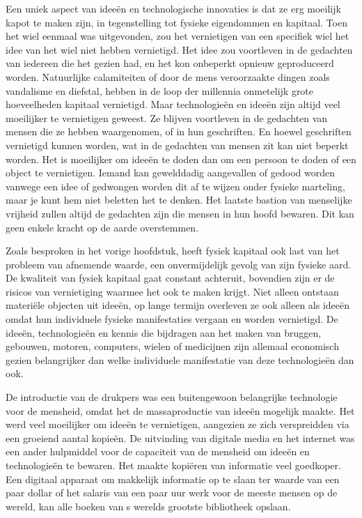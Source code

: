 \documentclass[
  a5paper,
  smalldemyvopaper,11pt,twoside,onecolumn,openright,extrafontsizes,
hidelinks]{memoir}
\begin{document}
Een uniek aspect van ideeën en technologische innovaties is dat ze erg
moeilijk kapot te maken zijn, in tegenstelling tot fysieke eigendommen
en kapitaal. Toen het wiel eenmaal was uitgevonden, zou het vernietigen
van een specifiek wiel het idee van het wiel niet hebben vernietigd. Het
idee zou voortleven in de gedachten van iedereen die het gezien had, en
het kon onbeperkt opnieuw geproduceerd worden. Natuurlijke calamiteiten
of door de mens veroorzaakte dingen zoals vandalisme en diefstal, hebben
in de loop der millennia onmetelijk grote hoeveelheden kapitaal
vernietigd. Maar technologieën en ideeën zijn altijd veel moeilijker te
vernietigen geweest. Ze blijven voortleven in de gedachten van mensen
die ze hebben waargenomen, of in hun geschriften. En hoewel geschriften
vernietigd kunnen worden, wat in de gedachten van mensen zit kan niet
beperkt worden. Het is moeilijker om ideeën te doden dan om een persoon
te doden of een object te vernietigen. Iemand kan gewelddadig
aangevallen of gedood worden vanwege een idee of gedwongen worden dit af
te wijzen onder fysieke marteling, maar je kunt hem niet beletten het te
denken. Het laatste bastion van menselijke vrijheid zullen altijd de
gedachten zijn die mensen in hun hoofd bewaren. Dit kan geen enkele
kracht op de aarde overstemmen.

Zoals besproken in het vorige hoofdstuk, heeft fysiek kapitaal ook last
van het probleem van afnemende waarde, een onvermijdelijk gevolg van
zijn fysieke aard. De kwaliteit van fysiek kapitaal gaat constant
achteruit, bovendien zijn er de risicos van vernietiging waarmee het ook
te maken krijgt. Niet alleen ontstaan materiële objecten uit ideeën, op
lange termijn overleven ze ook alleen als ideeën omdat hun individuele
fysieke manifestaties vergaan en worden vernietigd. De ideeën,
technologieën en kennis die bijdragen aan het maken van bruggen,
gebouwen, motoren, computers, wielen of medicijnen zijn allemaal
economisch gezien belangrijker dan welke individuele manifestatie van
deze technologieën dan ook.

De introductie van de drukpers was een buitengewoon belangrijke
technologie voor de mensheid, omdat het de massaproductie van ideeën
mogelijk maakte. Het werd veel moeilijker om ideeën te vernietigen,
aangezien ze zich verspreidden via een groeiend aantal kopieën. De
uitvinding van digitale media en het internet was een ander hulpmiddel
voor de capaciteit van de mensheid om ideeën en technologieën te
bewaren. Het maakte kopiëren van informatie veel goedkoper. Een digitaal
apparaat om makkelijk informatie op te slaan ter waarde van een paar
dollar of het salaris van een paar uur werk voor de meeste mensen op de
wereld, kan alle boeken van s werelds grootste bibliotheek opslaan.
\end{document}

